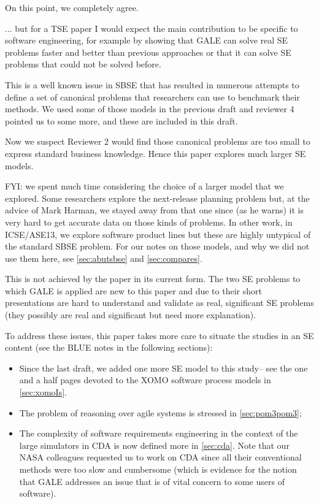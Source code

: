 \documentclass[10pt,journal,compsoc]{IEEEtran}
\newcommand{\bi}{\begin{itemize}}
\newcommand{\ei}{\end{itemize}}
\newcommand{\tion}[1]{\textsection\ref{sec:#1}}
\newenvironment{changed}{\par}{\par}
\begin{document}
\begin{changed}
On this point, we completely agree.
\end{changed}

... but for a TSE paper I
would expect the main contribution to be specific to
software engineering, for example by showing that
GALE can solve real SE problems faster and better
than previous approaches or that it can solve SE
problems that could not be solved before.
\begin{changed}

This is a
well known issue in SBSE that has resulted in
numerous attempts to define a set of canonical
problems that researchers can use to benchmark their
methods. We used some of those models in the previous draft
and reviewer 4 pointed us to some more, and these are
included in this draft.

Now we suspect Reviewer 2 would find those
canonical problems are too small to express
standard business knowledge. Hence this paper explores much
larger SE models.

FYI: we spent much time considering the choice of a larger
model that we explored.
Some researchers explore the
next-release planning problem but, at the advice of
Mark Harman, we stayed away from that one since (as
he warns) it is very hard to get accurate data on
those kinds of problems. 
In other work, in
ICSE/ASE13, we explore software product lines but these are highly untypical
of the standard SBSE problem.
For our notes on those models, and why we did not
use them here, see  \tion{abutsbse} 
and
\tion{compares}.

\end{changed}

 This is not achieved by the paper in its current
 form. The two SE problems to which GALE is applied
 are new to this paper and due to their short
 presentations are hard to understand and validate
 as real, significant SE problems (they possibly are
 real and significant but need more explanation). 

\begin{changed}
To address these issues, this paper takes more care
to situate the studies in an SE content (see the BLUE
notes in the following sections):
\bi
\item
Since the last draft, we added one
more SE model to this study-- see the one and a half
pages devoted to the XOMO software process models in \tion{xomoIs}.
\item
The problem of reasoning over agile systems is stressed in \tion{pom3pom3};
\item
The complexity of software requirements engineering in the context
of the large simulators in CDA is now defined more in \tion{cda}.
Note that our NASA colleagues requested us to work on CDA
since all their conventional methods were too slow and cumbersome (which is
evidence for the notion that GALE addresses an issue that is of
vital concern to some users of software).
\ei
\end{changed}
\end{document}
